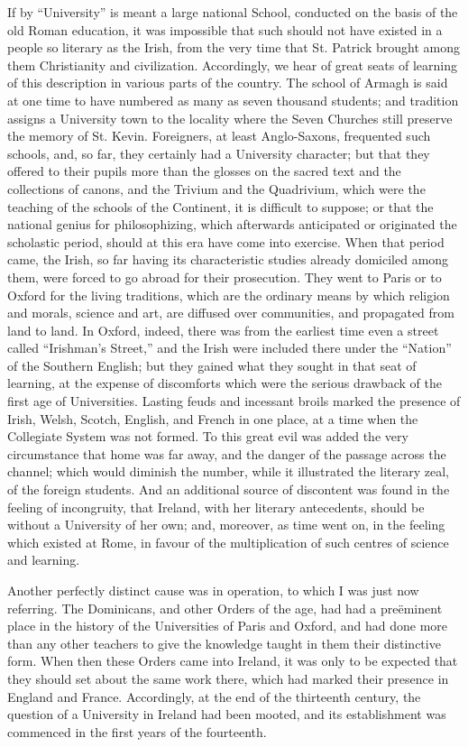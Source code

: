If by ``University'' is
meant a large national School, conducted on the basis of the old Roman
education, it was impossible that such should not have existed in a
people so literary as the Irish, from the very time that St. Patrick
brought among them Christianity and civilization. Accordingly, we hear
of great seats of learning of this description in various parts of the
country. The school of Armagh is said at one time to have numbered as
many as seven thousand students; and tradition assigns a University
town to the locality where the Seven Churches still preserve the
memory of St. Kevin. Foreigners, at least Anglo-Saxons, frequented
such schools, and, so far, they certainly had a University character;
but that they offered to their pupils more than the glosses on
the sacred text and the collections of canons, and the Trivium and the
Quadrivium, which were the teaching of the schools of the Continent,
it is difficult to suppose; or that the national genius for
philosophizing, which afterwards anticipated or originated the
scholastic period, should at this era have come into exercise. When
that period came, the Irish, so far having its characteristic studies
already domiciled among them, were forced to go abroad for their
prosecution. They went to Paris or to Oxford for the living
traditions, which are the ordinary means by which religion and morals,
science and art, are diffused over communities, and propagated from
land to land. In Oxford, indeed, there was from the earliest time even
a street called ``Irishman's Street,'' and the Irish were included
there under the ``Nation'' of the Southern English; but they gained
what they sought in that seat of learning, at the expense of
discomforts which were the serious drawback of the first age of Universities.
Lasting feuds and incessant broils marked the presence of Irish,
Welsh, Scotch, English, and French in one place, at a time when the
Collegiate System was not formed. To this great evil was added the
very circumstance that home was far away, and the danger of the
passage across the channel; which would diminish the number, while it
illustrated the literary zeal, of the foreign students. And an
additional source of discontent was found in the feeling of
incongruity, that Ireland, with her literary antecedents, should be
without a University of her own; and, moreover, as time went on, in
the feeling which existed at Rome, in favour of the multiplication of
such centres of science and learning.

Another perfectly distinct
cause was in operation, to which I was just now referring. The
Dominicans, and other Orders of the age, had had a preëminent
place in the history of the Universities of Paris and Oxford, and had
done more than any other teachers to give the knowledge taught in them
their distinctive form. When then these Orders came into Ireland, it
was only to be expected that they should set about the same work
there, which had marked their presence in England and France.
Accordingly, at the end of the thirteenth century, the question of a
University in Ireland had been mooted, and its establishment was
commenced in the first years of the fourteenth.

